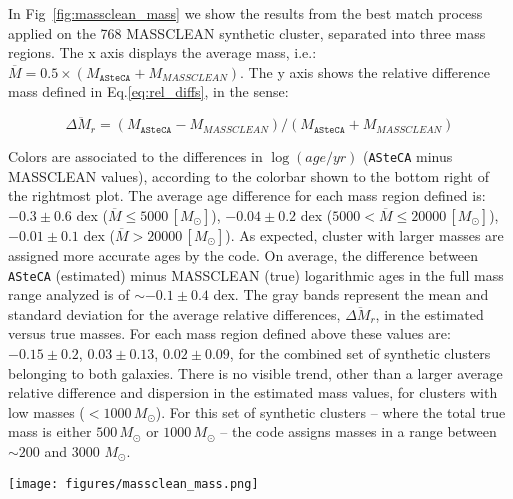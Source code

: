 \documentclass{aa}
\begin{document}
\begin{appendix}
In Fig~\ref{fig:massclean_mass} we show the results from the best match process
applied on the 768 MASSCLEAN synthetic cluster, separated into three mass
regions. The x axis displays the average
mass, i.e.: $\overline{M}=0.5\times(M_{\mathtt{ASteCA}}+M_{MASSCLEAN})$.
The y axis shows the relative difference mass defined in Eq.\ref{eq:rel_diffs},
in the sense:

\begin{equation}
\overline{\Delta M_r} = (M_{\mathtt{ASteCA}}-M_{MASSCLEAN})/(M_{\mathtt
{ASteCA}}+M_{MASSCLEAN})
\label{eq:rel_diffs2}
\end{equation}

\noindent Colors are associated to the differences in $\log(age/yr)$
(\texttt{ASteCA} minus MASSCLEAN values), according to the colorbar shown to the
bottom right of the rightmost plot. The average age difference for each mass
region defined is: 
$-0.3{\pm}0.6$ dex ($\overline{M}{\le}5000\,[M_{\odot}]$),
$-0.04{\pm}0.2$ dex ($5000{<}\overline{M}{\le}20000\,[M_{\odot}]$),
$-0.01{\pm}0.1$ dex ($\overline{M}{>}20000\,[M_{\odot}]$). As expected, cluster
with larger masses are assigned more accurate ages by the code.
On average, the difference between \texttt{ASteCA} (estimated) minus MASSCLEAN 
(true) logarithmic ages in the full mass range analyzed is of ${\sim}-0.1
{\pm}0.4$ dex.
%
The gray bands represent the mean and standard deviation for the average
relative differences, $\overline{\Delta M_r}$, in the estimated versus true
masses. For each mass region defined above these values are: $-0.15{\pm}0.2$,
$0.03{\pm}0.13$, $0.02{\pm}0.09$, for the combined set of synthetic clusters
belonging to both galaxies.
There is no visible trend, other than a larger average relative difference and
dispersion in the estimated mass values, for clusters with low masses
(${<}1000\,M_{\odot}$). For this set of synthetic clusters -- where the total
true mass is either $500\,M_{\odot}$ or $1000\,M_{\odot}$ -- the code assigns
masses in a range between ${\sim}200$ and 3000 $M_{\odot}$.


\begin{figure*}
\texttt{[image: figures/massclean\_mass.png]}
\caption{Recovered masses by \texttt{ASteCA}, for the set of 384 SMC MASSCLEAN
synthetic clusters. Relative masses are obtained in the sense
\texttt{ASteCA} minus MASSCLEAN (i.e.: estimated minus true values), and shown
in the y axis. The average masses in the x axis are perturbed with a small
random scatter to improve visibility.}
\label{fig:massclean_mass}
\end{figure*}



\end{appendix}
\end{document}
